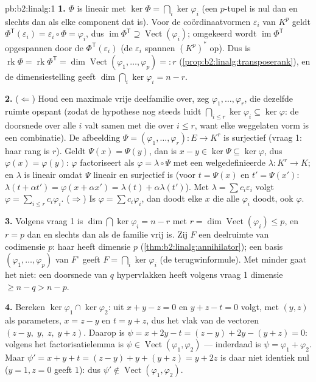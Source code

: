 \begin{solution}{pb:b2:linalg:1}
\textbf{1.} $\Phi$ is lineair met $\ker\Phi = \bigcap_i
\ker\varphi_i$ (een $p$-tupel is nul dan en slechts dan als elke
component dat is). Voor de coördinaatvormen $\varepsilon_i$ van
$K^p$ geldt $\Phi^{\mathsf T}(\varepsilon_i) = \varepsilon_i \circ
\Phi = \varphi_i$, dus $\operatorname{im}\Phi^{\mathsf T} \supseteq
\operatorname{Vect}(\varphi_i)$; omgekeerd wordt
$\operatorname{im}\Phi^{\mathsf T}$ opgespannen door de
$\Phi^{\mathsf T}(\varepsilon_i)$ (de $\varepsilon_i$ spannen
$(K^p)^*$ op). Dus is $\operatorname{rk}\Phi = \operatorname{rk}
\Phi^{\mathsf T} = \dim\operatorname{Vect}(\varphi_1, \dots,
\varphi_p) =: r$ (\cref{prop:b2:linalg:transposerank}), en de
dimensiestelling geeft $\dim\bigcap_i\ker\varphi_i = n - r$.

\textbf{2.} ($\Leftarrow$) Houd een maximale vrije deelfamilie
over, zeg $\varphi_1, \dots, \varphi_r$, die dezelfde ruimte
opspant (zodat de hypothese nog steeds luidt $\bigcap_{i \leq
r}\ker\varphi_i \subseteq \ker\varphi$: de doorsnede over alle $i$
valt samen met die over $i \leq r$, want elke weggelaten vorm is
een combinatie). De afbeelding $\Psi = (\varphi_1, \dots,
\varphi_r) \colon E \to K^r$ is surjectief (vraag 1: haar rang is
$r$). Geldt $\Psi(x) = \Psi(y)$, dan is $x - y \in \ker\Psi
\subseteq \ker\varphi$, dus $\varphi(x) = \varphi(y)$: $\varphi$
factoriseert als $\varphi = \lambda \circ \Psi$ met een
welgedefinieerde $\lambda \colon K^r \to K$; en $\lambda$ is
lineair omdat $\Psi$ lineair en surjectief is (voor $t = \Psi(x)$
en $t' = \Psi(x')$: $\lambda(t + \alpha t') = \varphi(x + \alpha
x') = \lambda(t) + \alpha\lambda(t')$). Met $\lambda = \sum c_i
\varepsilon_i$ volgt $\varphi = \sum_{i \leq r} c_i\varphi_i$.
($\Rightarrow$) Is $\varphi = \sum c_i \varphi_i$, dan doodt elke
$x$ die alle $\varphi_i$ doodt, ook $\varphi$.

\textbf{3.} Volgens vraag 1 is $\dim\bigcap\ker\varphi_i = n - r$
met $r = \dim\operatorname{Vect}(\varphi_i) \leq p$, en $r = p$
dan en slechts dan als de familie vrij is. Zij $F$ een deelruimte
van codimensie $p$: haar  heeft dimensie $p$
(\cref{thm:b2:linalg:annihilator}); een basis $(\varphi_1, \dots,
\varphi_p)$ van $F^\circ$ geeft $F = \bigcap_i\ker\varphi_i$ (de
terugwinformule). Met minder gaat het niet: een doorsnede van $q$
hypervlakken heeft volgens vraag 1 dimensie $\geq n - q > n - p$.

\textbf{4.} Bereken $\ker\varphi_1 \cap \ker\varphi_2$: uit $x + y
- z = 0$ en $y + z - t = 0$ volgt, met $(y, z)$ als parameters, $x
= z - y$ en $t = y + z$, dus het vlak van de vectoren $(z - y,\;
y,\; z,\; y + z)$. Daarop is $\psi = x + 2y - t = (z - y) + 2y -
(y + z) = 0$: volgens het factorisatielemma is $\psi \in
\operatorname{Vect}(\varphi_1, \varphi_2)$ --- inderdaad is $\psi
= \varphi_1 + \varphi_2$. Maar $\psi' = x + y + t = (z - y) + y +
(y + z) = y + 2z$ is daar niet identiek nul ($y = 1, z = 0$ geeft
$1$): dus $\psi' \notin \operatorname{Vect}(\varphi_1,
\varphi_2)$.


\end{solution}
